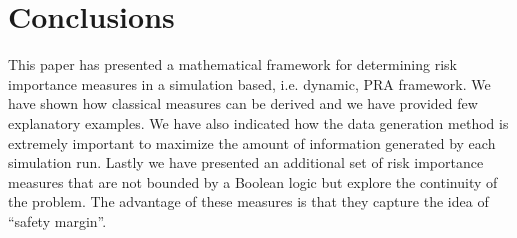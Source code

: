 \section{Conclusions}
\label{sec:conclusions}

This paper has presented a mathematical framework for determining risk 
importance measures in a simulation based, i.e. dynamic, PRA framework. 
We have shown how classical measures can be derived and
we have provided few explanatory examples. We have also indicated how the 
data generation method is extremely important to maximize the amount of 
information generated by each simulation run. Lastly we have presented an 
additional set of risk importance measures that are not bounded by a Boolean 
logic but explore the continuity of the problem. The advantage of these measures 
is that they capture the idea of ``safety margin''.

